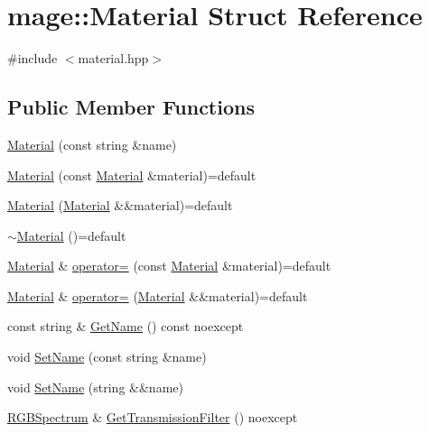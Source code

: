 \hypertarget{structmage_1_1_material}{}\section{mage\+:\+:Material Struct Reference}
\label{structmage_1_1_material}


{\ttfamily \#include $<$material.\+hpp$>$}

\subsection*{Public Member Functions}
\begin{DoxyCompactItemize}
\item 
\hyperlink{structmage_1_1_material_a0307d3bcf53c6ba270c8be4d127298db}{Material} (const string \&name)
\item 
\hyperlink{structmage_1_1_material_abed630412cdc4a6281389d128ec4b5f3}{Material} (const \hyperlink{structmage_1_1_material}{Material} \&material)=default
\item 
\hyperlink{structmage_1_1_material_a41bfbc2bfa16e3694ac443d390b804c2}{Material} (\hyperlink{structmage_1_1_material}{Material} \&\&material)=default
\item 
\hyperlink{structmage_1_1_material_a4ca65b7e24144ee08dd1ce8d0eda9284}{$\sim$\+Material} ()=default
\item 
\hyperlink{structmage_1_1_material}{Material} \& \hyperlink{structmage_1_1_material_a7ebc9986924ca13ae8468005518dcfc7}{operator=} (const \hyperlink{structmage_1_1_material}{Material} \&material)=default
\item 
\hyperlink{structmage_1_1_material}{Material} \& \hyperlink{structmage_1_1_material_a500a2ebe99d4d7b3be5bf57b6bff62a1}{operator=} (\hyperlink{structmage_1_1_material}{Material} \&\&material)=default
\item 
const string \& \hyperlink{structmage_1_1_material_a9edb2f437eca07c6c12c24d10ec30eb3}{Get\+Name} () const noexcept
\item 
void \hyperlink{structmage_1_1_material_a4795f7aa36a445c09af6268a4af8cb61}{Set\+Name} (const string \&name)
\item 
void \hyperlink{structmage_1_1_material_ad612e4174b030bb002cedaf054e18f82}{Set\+Name} (string \&\&name)
\item 
\hyperlink{structmage_1_1_r_g_b_spectrum}{R\+G\+B\+Spectrum} \& \hyperlink{structmage_1_1_material_aba949cb74176530638c7bcb100882196}{Get\+Transmission\+Filter} () noexcept
\item 

\end{DoxyCompactItemize}
